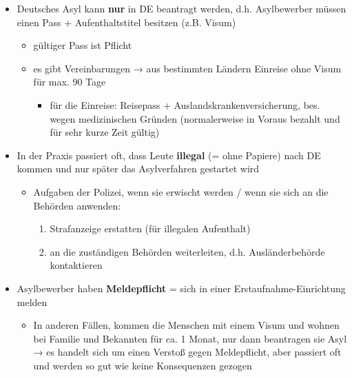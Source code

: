\documentclass[
]{article}
\providecommand{\tightlist}{%
  \setlength{\itemsep}{0pt}\setlength{\parskip}{0pt}}
\begin{document}
\begin{itemize}
\tightlist
\item
  Deutsches Asyl kann \textbf{nur} in DE beantragt werden, d.h.
  Asylbewerber müssen einen Pass + Aufenthaltstitel besitzen (z.B.
  Visum)

  \begin{itemize}
  \tightlist
  \item
    gültiger Pass ist Pflicht
  \item
    es gibt Vereinbarungen → aus bestimmten Ländern Einreise ohne Visum
    für max. 90 Tage

    \begin{itemize}
    \tightlist
    \item
      für die Einreise: Reisepass + Auslandskrankenversicherung, bes.
      wegen medizinischen Gründen (normalerweise in Voraus bezahlt und
      für sehr kurze Zeit gültig)
    \end{itemize}
  \end{itemize}
\item
  In der Praxis passiert oft, dass Leute \textbf{illegal} (= ohne
  Papiere) nach DE kommen und nur später das Asylverfahren gestartet
  wird

  \begin{itemize}
  \tightlist
  \item
    Aufgaben der Polizei, wenn sie erwischt werden / wenn sie sich an
    die Behörden anwenden:

    \begin{enumerate}
    \tightlist
    \item
      Strafanzeige erstatten (für illegalen Aufenthalt)
    \item
      an die zuständigen Behörden weiterleiten, d.h. Ausländerbehörde
      kontaktieren
    \end{enumerate}
  \end{itemize}
\item
  Asylbewerber haben \textbf{Meldepflicht} = sich in einer
  Erstaufnahme-Einrichtung melden

  \begin{itemize}
  \tightlist
  \item
    In anderen Fällen, kommen die Menschen mit einem Visum und wohnen
    bei Familie und Bekannten für ca. 1 Monat, nur dann beantragen sie
    Asyl\\
    → es handelt sich um einen Verstoß gegen Meldepflicht, aber passiert
    oft und werden so gut wie keine Konsequenzen gezogen


\end{itemize}
\end{itemize}
\end{document}
